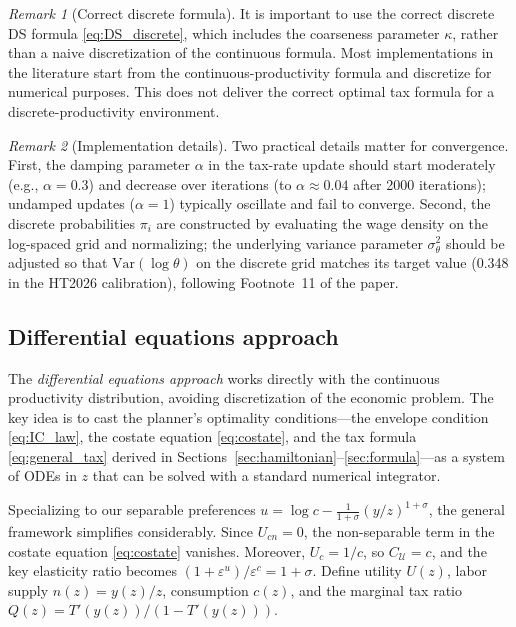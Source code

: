 \documentclass[12pt,a4paper]{article}
\theoremstyle{definition}
\theoremstyle{plain}
\theoremstyle{remark}
\newtheorem{remark}{Remark}[section]
\newcommand{\calU}{\mathcal{U}}
\begin{document}
\begin{remark}[Correct discrete formula]
It is important to use the correct discrete DS formula \eqref{eq:DS_discrete}, which includes the coarseness parameter $\kappa$, rather than a naive discretization of the continuous formula. Most implementations in the literature start from the continuous-productivity formula and discretize for numerical purposes. This does not deliver the correct optimal tax formula for a discrete-productivity environment.
\end{remark}

\begin{remark}[Implementation details]
Two practical details matter for convergence. First, the damping parameter $\alpha$ in the tax-rate update should start moderately (e.g., $\alpha = 0.3$) and decrease over iterations (to $\alpha \approx 0.04$ after 2000 iterations); undamped updates ($\alpha = 1$) typically oscillate and fail to converge. Second, the discrete probabilities $\pi_i$ are constructed by evaluating the wage density on the log-spaced grid and normalizing; the underlying variance parameter $\sigma_\theta^2$ should be adjusted so that $\mathrm{Var}(\log\theta)$ on the discrete grid matches its target value (0.348 in the HT2026 calibration), following Footnote~11 of the paper.
\end{remark}


\subsection{Differential equations approach}
\label{sec:ode_approach}

The \emph{differential equations approach} works directly with the continuous productivity distribution, avoiding discretization of the economic problem. The key idea is to cast the planner's optimality conditions---the envelope condition \eqref{eq:IC_law}, the costate equation \eqref{eq:costate}, and the tax formula \eqref{eq:general_tax} derived in Sections~\ref{sec:hamiltonian}--\ref{sec:formula}---as a system of ODEs in $z$ that can be solved with a standard numerical integrator.

Specializing to our separable preferences $u = \log c - \frac{1}{1+\sigma}(y/z)^{1+\sigma}$, the general framework simplifies considerably. Since $U_{cn} = 0$, the non-separable term in the costate equation \eqref{eq:costate} vanishes. Moreover, $U_c = 1/c$, so $C_{\calU} = c$, and the key elasticity ratio becomes $(1+\varepsilon^u)/\varepsilon^c = 1 + \sigma$. Define utility $U(z)$, labor supply $n(z) = y(z)/z$, consumption $c(z)$, and the marginal tax ratio $Q(z) = T'(y(z))/(1 - T'(y(z)))$.
\end{document}
